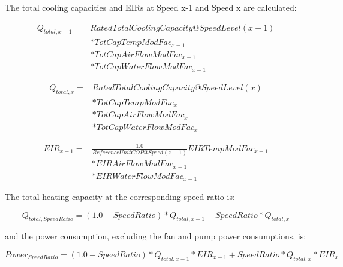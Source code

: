 The total cooling capacities and EIRs at Speed x-1 and Speed x are calculated:

\begin{equation}
  \begin{array}{rl}
    {Q_{total,x - 1}} =& RatedTotalCoolingCapacity@SpeedLevel\left( {x - 1} \right) \\
                      &* TotCapTempModFac_{x - 1} \\
                      &* TotCapAirFlowModFac_{x - 1} \\
                      &* TotCapWaterFlowModFac_{x - 1}
  \end{array}
\end{equation}

\begin{equation}
  \begin{array}{rl}
    {Q_{total,x}} =& RatedTotalCoolingCapacity@SpeedLevel\left( x \right) \\
                  &* TotCapTempModFac_x \\
                  &* TotCapAirFlowModFac_x \\
                  &* TotCapWaterFlowModFac_x
  \end{array}
\end{equation}

\begin{equation}
  \begin{array}{rl}
    EIR_{x - 1} =& \frac{{1.0}}{{ReferenceUnitCOP@Speed(x - 1)}}EIRTempModFac_{x - 1} \\
                &* EIRAirFlowModFac_{x - 1} \\
                &* EIRWaterFlowModFac_{x - 1}
  \end{array}
\end{equation}

The total heating capacity at the corresponding speed ratio is:

\begin{equation}
{Q_{total,SpeedRatio}} = \left( {1.0 - SpeedRatio} \right)*{Q_{total,x - 1}} + SpeedRatio*{Q_{total,x}}
\end{equation}

and the power consumption, excluding the fan and pump power consumptions, is:

\begin{equation}
Powe{r_{SpeedRatio}} = \left( {1.0 - SpeedRatio} \right)*{Q_{total,x - 1}}*EI{R_{x - 1}} + SpeedRatio*{Q_{total,x}}*EI{R_x}
\end{equation}

